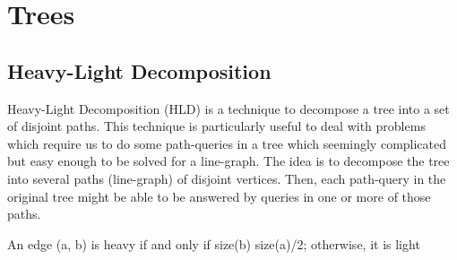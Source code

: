 \section{Trees}

\subsection{Heavy-Light Decomposition}
Heavy-Light Decomposition (HLD) is a technique to decompose a tree into a set of disjoint paths. This technique is particularly useful to deal with problems which require us to do some path-queries in a tree which seemingly complicated but easy enough to be solved for a line-graph. The idea is to decompose the tree into several paths (line-graph) of disjoint vertices. Then, each path-query in the original tree might be able to be answered by queries in one or more of those paths.

An edge (a, b) is heavy if and only if size(b)
size(a)/2; otherwise, it is light
